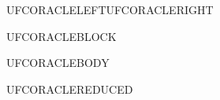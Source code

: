 \documentclass{abntexto-ufc}
\begin{document}
\textual

\noindent UFCORACLELEFT\hfill UFCORACLERIGHT\par

\vspace*{0.48\textheight}
\noindent UFCORACLEBLOCK\par

\vspace{2\baselineskip}
\noindent UFCORACLEBODY\par

{\fontsize{10pt}{12pt}\selectfont\noindent UFCORACLEREDUCED\par}
\end{document}
